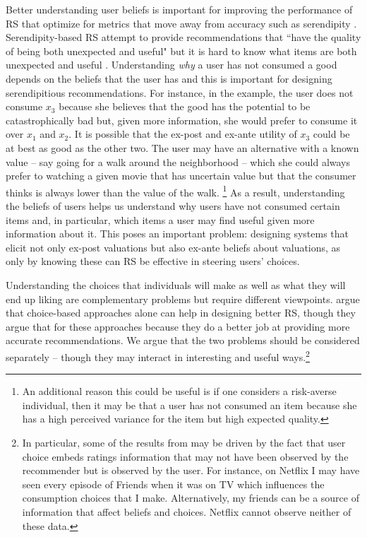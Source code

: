 \documentclass[sigconf]{acmart}
\begin{document}
\par
Better understanding user beliefs is important for improving the performance of RS that optimize for metrics that move away from accuracy such as serendipity \cite{kotkov2016survey}. Serendipity-based RS attempt to provide recommendations that ``have the quality of being both unexpected and useful" \cite{maksai2015predicting} but it is hard to know what items are both unexpected and useful \cite{kotkov2016survey}. Understanding \textit{why} a user has not consumed a good depends on the beliefs that the user has and this is important for designing serendipitious recommendations. For instance, in the example, the user does not consume $x_3$ because she believes that the good has the potential to be catastrophically bad but, given more information, she would prefer to consume it over $x_1$ and $x_2$. It is possible that the ex-post and ex-ante utility of $x_3$ could be at best as good as the other two. The user may have an alternative with a known value -- say going for a walk around the neighborhood -- which she could always prefer to watching a given movie that has uncertain value but that the consumer thinks is always lower than the value of the walk.
\footnote{An additional reason this could be useful is if one considers a risk-averse individual, then it may be that a user has not consumed an item because she has a high perceived variance for the item but high expected quality.}
As a result, understanding the beliefs of users helps us understand why users have not consumed certain items and, in particular, which items a user may find useful given more information about it. This poses an important problem: designing systems that elicit not only ex-post valuations but also ex-ante beliefs about valuations, as only by knowing these can RS be effective in steering users' choices.
\par
Understanding the choices that individuals will make as well as what they will end up liking are complementary problems but require different viewpoints. \cite{jiang2014choice, saavedra2016choice} argue that choice-based approaches alone can help in designing better RS, though they argue that for these approaches because they do a better job at providing more accurate recommendations. We argue that the two problems should be considered separately -- though they may interact in interesting and useful ways.\footnote{In particular, some of the results from \cite{jiang2014choice, saavedra2016choice} may be driven by the fact that user choice embeds ratings information that may not have been observed by the recommender but is observed by the user. For instance, on Netflix I may have seen every episode of Friends when it was on TV which influences the consumption choices that I make. Alternatively, my friends can be a source of information that affect beliefs and choices. Netflix cannot observe neither of these data.} 
\end{document}
